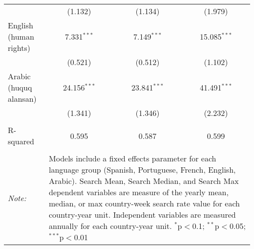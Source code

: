 \begin{table}[!htbp]
\begin{tabular}{@{\extracolsep{5pt}}lccc}
  & (1.132) & (1.134) & (1.979) \\ 
  English (human rights) & 7.331$^{***}$ & 7.149$^{***}$ & 15.085$^{***}$ \\ 
  & (0.521) & (0.512) & (1.102) \\ 
  Arabic (huquq alansan) & 24.156$^{***}$ & 23.841$^{***}$ & 41.491$^{***}$ \\ 
  & (1.341) & (1.346) & (2.232) \\ 
 \hline \\[-1.8ex] 
R-squared  & 0.595 & 0.587 & 0.599 \\ 
\hline 
\hline \\[-1.8ex] 
\textit{Note:}  & \multicolumn{3}{l}{\parbox[t]{8cm}{Models include a fixed effects parameter for each language group (Spanish, Portuguese, French, English, Arabic). Search Mean, Search Median, and Search Max dependent variables are measure of the yearly mean, median, or max country-week search rate value for each country-year unit. Independent variables are measured annually for each country-year unit. $^{*}$p$<$0.1; $^{**}$p$<$0.05; $^{***}$p$<$0.01}} \\ 
\end{tabular} 
\end{table} 
